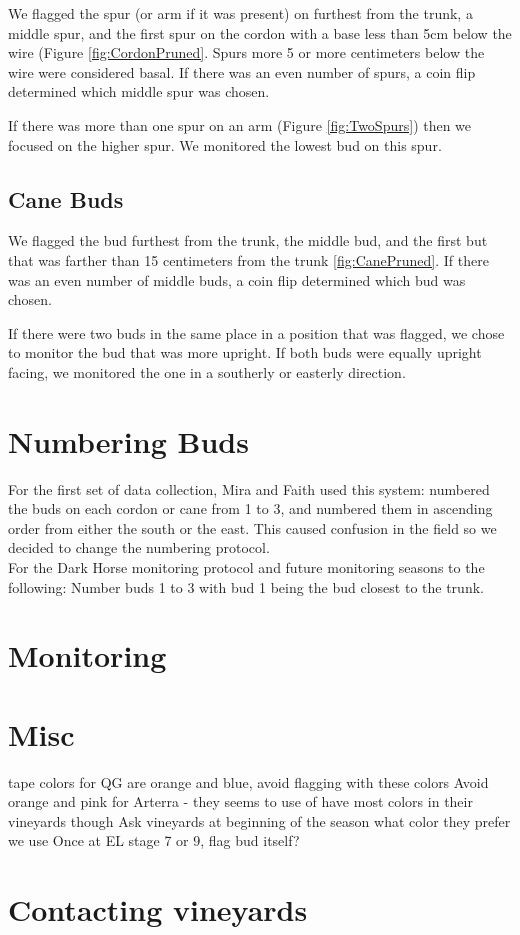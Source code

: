 \documentclass[11pt,letter]{article}
\begin{document}
We flagged the spur (or arm if it was present) on furthest from the trunk, a middle spur, and the first spur on the cordon with a base less than 5cm below the wire (Figure \ref{fig:CordonPruned}. Spurs more 5 or more centimeters below the wire were considered basal. If there was an even number of spurs, a coin flip determined which middle spur was chosen.

If there was more than one spur on an arm (Figure \ref{fig:TwoSpurs}) then we focused on the higher spur. We monitored the lowest bud on this spur. 

\subsection{Cane Buds}

We flagged the bud furthest from the trunk, the middle bud, and the first but that was farther than 15 centimeters from the trunk \ref{fig:CanePruned}. If there was an even number of middle buds, a coin flip determined which bud was chosen. 

If there were two buds in the same place in a position that was flagged, we chose to monitor the bud that was more upright. If both buds were equally upright facing, we monitored the one in a southerly or easterly direction. 

\section{Numbering Buds}
For the first set of data collection, Mira and Faith used this system: numbered the buds on each cordon or cane from 1 to 3, and numbered them in ascending order from either the south or the east. This caused confusion in the field so we decided to change the numbering protocol. \\

For the Dark Horse monitoring protocol and future monitoring seasons to the following:
Number buds 1 to 3 with bud 1 being the bud closest to the trunk. 

\section{Monitoring}

\section{Misc}
tape colors for QG are orange and blue, avoid flagging with these colors
Avoid orange and pink for Arterra - they seems to use of have most colors in their vineyards though
Ask vineyards at beginning of the season what color they prefer we use
Once at EL stage 7 or 9, flag bud itself?

\section{Contacting vineyards}
\end{document}

